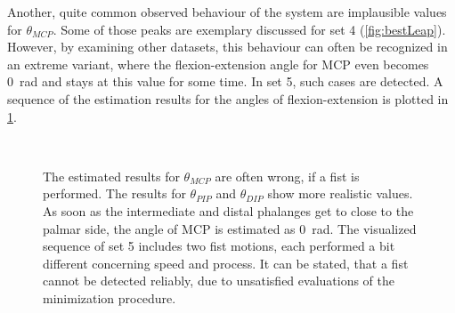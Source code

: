 Another, quite common observed behaviour of the system are implausible values for $ \theta_{MCP} $. Some of those peaks are exemplary discussed for set 4 (\ref{fig:bestLeap}). However, by examining other datasets, this behaviour can often be recognized in an extreme variant, where the flexion-extension angle for \ac{MCP} even becomes \SI{0}{\radian} and stays at this value for some time. In set 5, such cases are detected. A sequence of the estimation results for the angles of flexion-extension is plotted in \ref{fig:set5}.
\begin{figure}
\centering
{}\\
\caption[Occurrence of wrong estimated states for $ \theta_{MCP} $]
{The estimated results for $ \theta_{MCP} $ are often wrong, if a fist is performed. The results for $ \theta_{PIP} $ and $ \theta_{DIP} $ show more realistic values. As soon as the intermediate and distal phalanges get to close to the palmar side, the angle of \ac{MCP} is estimated as \SI{0}{\radian}. The visualized sequence of set 5 includes two fist motions, each performed a bit different concerning speed and process. It can be stated, that a fist cannot be detected reliably, due to unsatisfied evaluations of the minimization procedure.}
\label{fig:set5}
\end{figure}

